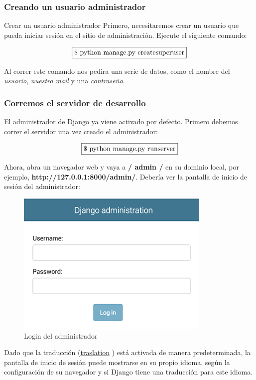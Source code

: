 \documentclass[10pt]{article}
\newcommand{\django}[1]{{\textcolor{G}{Django} #1}}
\begin{document}
\subsubsection*{Creando un usuario administrador}

Crear un usuario administrador Primero, necesitaremos crear un usuario que pueda iniciar sesión en el sitio de administración. Ejecute el siguiente comando:

$$\fbox{\$ python manage.py createsuperuser}$$

Al correr este comando nos pedira una serie de datos, como el nombre del \textit{usuario}, \textit{nuestro mail} y una \textit{contraseña}.

\subsubsection*{Corremos el servidor de desarrollo}
El administrador de \django{} ya viene activado por defecto. 
Primero debemos correr el servidor una vez creado el administrador:

$$\fbox{\$ python manage.py runserver}$$


Ahora, abra un navegador web y vaya a \textbf{/ admin /} en su dominio local, por ejemplo, \textbf{http://127.0.0.1:8000/admin/}. Debería ver la pantalla de inicio de sesión del administrador:

\begin{figure}[H]
\begin{center}
\includegraphics[scale=0.9]{figuras/3/32/325/img1.png}
\caption{Login del administrador}
\end{center}
\end{figure}


Dado que la traducción ({\href{https://docs.djangoproject.com/en/3.0/topics/i18n/translation/}{\textcolor{B}{traslation}}}
) está activada de manera predeterminada, la pantalla de inicio de sesión puede mostrarse en su propio idioma, según la configuración de su navegador y si \django{} tiene una traducción para este idioma.
\end{document}
